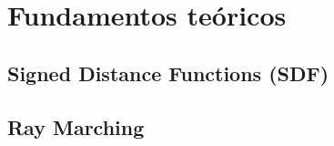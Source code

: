 \chapter{Fundamentos teóricos}


\section{Signed Distance Functions (SDF)}

\section{Ray Marching}




